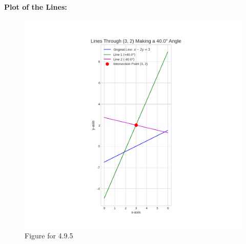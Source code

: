 \documentclass[journal]{IEEEtran}
\begin{document}
\newpage
\textbf{Plot of the Lines:}
\begin{figure}[H]
    \centering
    \includegraphics[width=1.1\columnwidth]{figs/fig1.png}
    \caption{Figure for 4.9.5}
    \label{}
\end{figure}
\end{document}
